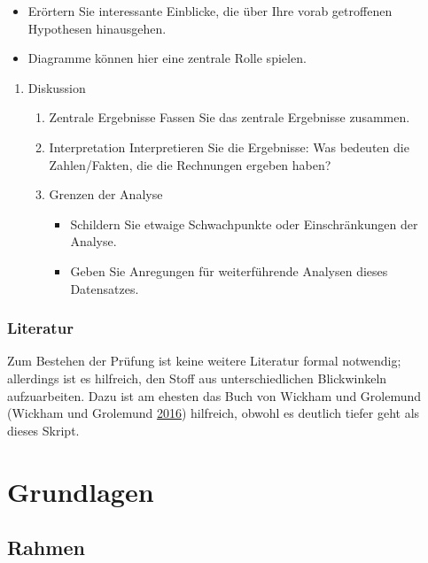 \documentclass[12pt,ngerman,]{book}
\providecommand{\tightlist}{%
  \setlength{\itemsep}{0pt}\setlength{\parskip}{0pt}}
\theoremstyle{definition}
\theoremstyle{definition}
\theoremstyle{remark}
\begin{document}
\begin{itemize}
\tightlist
\item
  Erörtern Sie interessante Einblicke, die über Ihre vorab getroffenen
  Hypothesen hinausgehen.
\item
  Diagramme können hier eine zentrale Rolle spielen.
\end{itemize}

\begin{enumerate}
\def\labelenumi{\arabic{enumi}.}
\setcounter{enumi}{3}
\item
  Diskussion

  \begin{enumerate}
  \def\labelenumii{\arabic{enumii}.}
  \item
    Zentrale Ergebnisse Fassen Sie das zentrale Ergebnisse zusammen.
  \item
    Interpretation Interpretieren Sie die Ergebnisse: Was bedeuten die
    Zahlen/Fakten, die die Rechnungen ergeben haben?
  \item
    Grenzen der Analyse

    \begin{itemize}
    \tightlist
    \item
      Schildern Sie etwaige Schwachpunkte oder Einschränkungen der
      Analyse.
    \item
      Geben Sie Anregungen für weiterführende Analysen dieses
      Datensatzes.
    \end{itemize}
  \end{enumerate}
\end{enumerate}

\section{Literatur}\label{literatur}

Zum Bestehen der Prüfung ist keine weitere Literatur formal notwendig;
allerdings ist es hilfreich, den Stoff aus unterschiedlichen
Blickwinkeln aufzuarbeiten. Dazu ist am ehesten das Buch von Wickham und
Grolemund (Wickham und Grolemund \protect\hyperlink{ref-r4ds}{2016})
hilfreich, obwohl es deutlich tiefer geht als dieses Skript.

\mainmatter

\setcounter{chapter}{0} \part{Grundlagen}

\chapter{Rahmen}\label{Rahmen}
\end{document}
